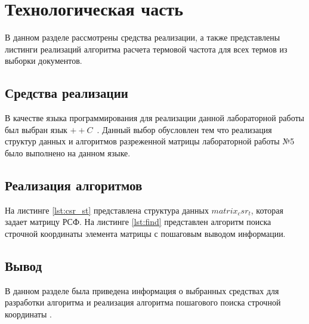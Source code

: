 \chapter{Технологическая часть}

В данном разделе рассмотрены средства реализации, а также представлены листинги реализаций алгоритма расчета термовой частота для всех термов из выборки документов.

\section{Средства реализации}

В качестве языка программирования для реализации данной лабораторной работы был выбран язык $++C$~\cite{cpp-lang}. 
Данный выбор обусловлен тем  что реализация структур данных и алгоритмов разреженной матрицы лабораторной работы №5 было выполнено на данном языке.

\section{Реализация алгоритмов}

На листинге \ref{lst:csr_st} представлена структура данных $matrix_csr_t$, которая задает матрицу РСФ.
На листинге \ref{lst:find} представлен алгоритм поиска строчной координаты элемента матрицы с пошаговым выводом информации.



\clearpage



\clearpage


\section*{Вывод}

В данном разделе была приведена информация о выбранных средствах для разработки алгоритма и реализация алгоритма пошагового поиска строчной координаты . 